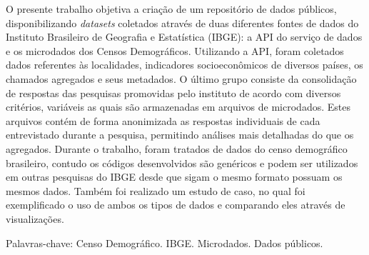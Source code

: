 \setlength{\absparsep}{18pt} 
\begin{resumo}[Resumo]

O presente trabalho objetiva a criação de um repositório de dados públicos, disponibilizando \textit{datasets} coletados através de duas diferentes fontes de dados do Instituto Brasileiro de Geografia e Estatística  (IBGE): a API do serviço de dados e os microdados dos Censos Demográficos. Utilizando a API, foram coletados dados referentes às localidades, indicadores socioeconômicos de diversos países, os chamados agregados e seus metadados. O último grupo consiste da consolidação de respostas das pesquisas promovidas pelo instituto de acordo com diversos critérios, variáveis as quais são armazenadas em arquivos de microdados. Estes arquivos contém de forma anonimizada as respostas individuais de cada entrevistado durante a pesquisa, permitindo análises mais detalhadas do que os agregados. Durante o trabalho, foram tratados de dados do censo demográfico brasileiro, contudo os códigos desenvolvidos são genéricos e podem ser utilizados em outras pesquisas do IBGE desde que sigam o mesmo formato  possuam os mesmos dados. Também foi realizado um estudo de caso, no qual foi exemplificado o uso de ambos os tipos de dados e comparando eles através de visualizações.

Palavras-chave: Censo Demográfico. IBGE. Microdados. Dados públicos.

\end{resumo}

